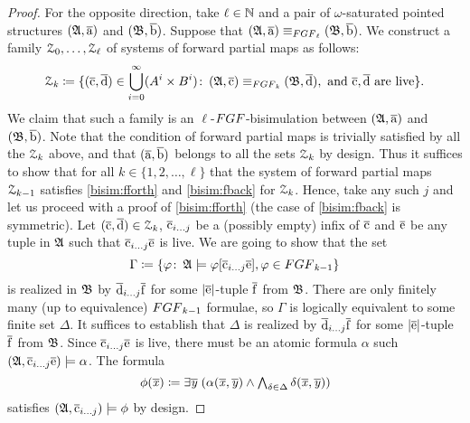 \begin{proof}
For the opposite direction, take $\ell \in {\mathbb{N}}$ and a pair of $\omega$-saturated pointed structures $({\mathfrak{A}}, \overline{\mathrm{a}})$ and $({\mathfrak{B}}, \overline{\mathrm{b}})$.
Suppose that $(\str{A}, \elemtuplea) \equiv_{\FGF_\ell} (\str{B}, \elemtupleb)$.
We construct a family $\mathcal{Z}_0, \ldots, \mathcal{Z}_\ell$ of systems of forward partial maps as follows:
\[
	\bisimZ_{\mathit{k}} \coloneqq \{ (\elemtuplec, \elemtupled) \in \bigcup_{i=0}^{\infty} (A^i \times B^i) \colon\,  (\str{A}, \elemtuplec) \equiv_{\FGF_{\mathit{k}}} (\str{B}, \elemtupled), \ \text{and} \ \elemtuplec, \elemtupled \ \text{are live} \}.
\]
We claim that such a family is an $\ell$-$\FGF$-bisimulation between $({\mathfrak{A}}, \overline{\mathrm{a}})$ and $({\mathfrak{B}}, \overline{\mathrm{b}})$.
	Note that the condition of forward partial maps is trivially satisfied by all the $\mathcal{Z}_{\mathit{k}}$ above, and that $(\overline{\mathrm{a}}, \overline{\mathrm{b}})$ belongs to all the sets $\mathcal{Z}_{\mathit{k}}$ by design.
Thus it suffices to show that for all $\mathit{k} \in \{ 1, 2, \ldots, \ell\}$ that the system of forward partial
maps $\mathcal{Z}_{k-1}$ satisfies \ref{bisim:fforth} and \ref{bisim:fback} for $\mathcal{Z}_{\mathit{k}}$.
Hence, take any such $j$ and let us proceed with a proof of \ref{bisim:fforth} (the case of \ref{bisim:fback} is symmetric).
	Let $(\overline{\mathrm{c}}, \overline{\mathrm{d}}) \in \mathcal{Z}_{\mathit{k}}$, $\overline{\mathrm{c}}_{i\ldots j}$ be a (possibly empty) infix of $\overline{\mathrm{c}}$
and $\overline{\mathrm{e}}$ be any tuple in ${\mathfrak{A}}$ such that $\overline{\mathrm{c}}_{i\ldots j}\overline{\mathrm{e}}$ is live.
We are going to show that the set
\[
  \Gamma \deff \{ \varphi \colon\, \str{A} \models \varphi[\elemtuplecfromto{i}{j}\elemtuplee], \varphi \in \FGF_{\mathit{k}{-}1} \}
\]
is realized in ${\mathfrak{B}}$ by $\overline{\mathrm{d}}_{i\ldots j}\overline{\mathrm{f}}$ for some $|\overline{\mathrm{e}}|$-tuple $\overline{\mathrm{f}}$ from ${\mathfrak{B}}$.
There are only finitely many (up to equivalence) $\FGF_{k{-}1}$ formulae, so $\Gamma$ is logically equivalent to some finite set $\Delta$.
It suffices to establish that $\Delta$ is realized by $\overline{\mathrm{d}}_{i\ldots j}\overline{\mathrm{f}}$ for some $|\overline{\mathrm{e}}|$-tuple $\overline{\mathrm{f}}$ from ${\mathfrak{B}}$.
Since $\overline{\mathrm{c}}_{i\ldots j}\overline{\mathrm{e}}$ is live, there must be an atomic formula $\alpha$ such $({\mathfrak{A}}, \overline{\mathrm{c}}_{i\ldots j}\overline{\mathrm{e}}) \models \alpha$.
The formula
\begin{equation*}
  \phi(\overline{\mathit{x}}) \coloneqq \exists{\overline{\mathit{y}}} \; (\alpha(\overline{\mathit{x}}, \overline{\mathit{y}}) \wedge \textstyle\bigwedge_{\delta \in \Delta} \delta(\overline{\mathit{x}}, \overline{\mathit{y}}))
\end{equation*}
satisfies $({\mathfrak{A}}, \overline{\mathrm{c}}_{i\ldots j}) \models \phi$ by design.

\end{proof}

